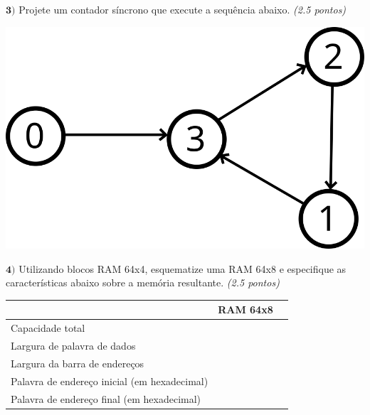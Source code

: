 \documentclass[12pt]{article}
\newcommand{\exerc}[3]{ \vspace*{25pt} {$\mathbf{#1)}$} #2 \hfill {\it #3} }
\begin{document}
\exerc{3}{Projete um contador síncrono que execute a sequência abaixo.}{(2.5 pontos)}
\begin{center}
  \includegraphics[scale=0.25]{seq}
\end{center}

\exerc{4}{Utilizando blocos RAM 64x4, esquematize uma RAM 64x8 e especifique as
  características abaixo sobre a memória resultante.}{(2.5 pontos)}
\\
\begin{center}
\begin{tabular}{|l|c|c|}
 \cline{2-2}
 \multicolumn{1}{c|}{} & {\bf RAM 64x8} \\ \hline
 Capacidade total & \phantom{aaaaaaaaaaaaaa} \\ \hline
 Largura de palavra de dados & \\ \hline
 Largura da barra de endereços & \\ \hline
 Palavra de endereço inicial (em hexadecimal) & \\ \hline
 Palavra de endereço final (em hexadecimal) & \\ \hline
\end{tabular}
\end{center}
\end{document}
